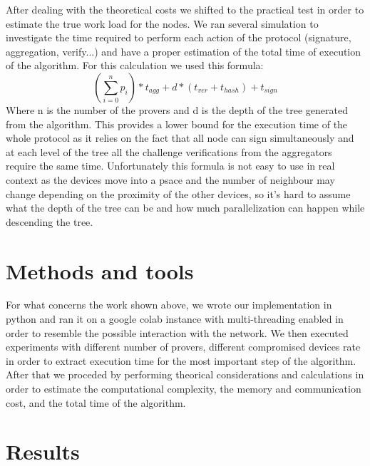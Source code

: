 \documentclass[10pt, a4paper, twocolumn]{article} %
\begin{document}
After dealing with the theoretical costs we shifted to the practical test in order to estimate the true work load for the nodes.
We ran several simulation to investigate the time required to perform each action of the protocol (signature, aggregation, verify...) and have a proper estimation of the total time of execution of the algorithm.
For this calculation we used this formula:
\[(\sum_{i=0}^{n} p_i) * t_{agg} + d * (t_{ver} + t_{hash}) + t_{sign} \]
Where n is the number of the provers and d is the depth of the tree generated from the algorithm.
This provides a lower bound for the execution time of the whole protocol as it relies on the fact that all node can sign simultaneously and at each level of the tree all the challenge verifications from the aggregators require the same time.
Unfortunately this formula is not easy to use in real context as the devices move into a psace and the number of neighbour may change depending on the proximity of the other devices, so it's hard to assume what the depth of the tree can be and how much parallelization can happen while descending the tree.
\section{Methods and tools}

For what concerns the work shown above, we wrote our implementation in python and ran it on a google colab instance with multi-threading enabled in order to resemble the possible interaction with the network.
We then executed experiments with different number of provers, different compromised devices rate in order to extract execution time for the most important step of the algorithm.
After that we proceded by performing theorical considerations and calculations in order to estimate the computational complexity, the memory and communication cost, and the total time of the algorithm.

\section{Results}
\label{sec:results}
\end{document}

